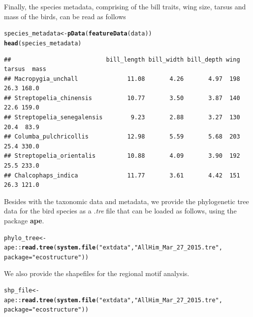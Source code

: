 \documentclass[12pt]{article}\usepackage[]{graphicx}\usepackage[usenames,dvipsnames]{color}
\makeatletter
\newcommand{\hlstr}[1]{\textcolor[rgb]{0.192,0.494,0.8}{#1}}%
\newcommand{\hlopt}[1]{\textcolor[rgb]{0,0,0}{#1}}%
\newcommand{\hlstd}[1]{\textcolor[rgb]{0.345,0.345,0.345}{#1}}%
\newcommand{\hlkwb}[1]{\textcolor[rgb]{0.69,0.353,0.396}{#1}}%
\newcommand{\hlkwc}[1]{\textcolor[rgb]{0.333,0.667,0.333}{#1}}%
\newcommand{\hlkwd}[1]{\textcolor[rgb]{0.737,0.353,0.396}{\textbf{#1}}}%
\newenvironment{kframe}{%
 \def\at@end@of@kframe{}%
 \ifinner\ifhmode%
  \def\at@end@of@kframe{\end{minipage}}%
  \begin{minipage}{\columnwidth}%
 \fi\fi%
 \def\FrameCommand##1{\hskip\@totalleftmargin \hskip-\fboxsep
 \colorbox{shadecolor}{##1}\hskip-\fboxsep
     \hskip-\linewidth \hskip-\@totalleftmargin \hskip\columnwidth}%
 \MakeFramed {\advance\hsize-\width
   \@totalleftmargin\z@ \linewidth\hsize
   \@setminipage}}%
 {\par\unskip\endMakeFramed%
 \at@end@of@kframe}
\newenvironment{knitrout}{}{} %
\makeatother
\begin{document}
Finally, the species metadata, comprising of the bill traits, wing size, tarsus and mass of the birds, can be read as follows

\begin{knitrout}
\color{fgcolor}\begin{kframe}
\begin{alltt}
\hlstd{species_metadata} \hlkwb{<-} \hlkwd{pData}\hlstd{(}\hlkwd{featureData}\hlstd{(data))}
\hlkwd{head}\hlstd{(species_metadata)}
\end{alltt}
\begin{verbatim}
##                           bill_length bill_width bill_depth wing tarsus  mass
## Macropygia_unchall              11.08       4.26       4.97  198   26.3 168.0
## Streptopelia_chinensis          10.77       3.50       3.87  140   22.6 159.0
## Streptopelia_senegalensis        9.23       2.88       3.27  130   20.4  83.9
## Columba_pulchricollis           12.98       5.59       5.68  203   25.4 330.0
## Streptopelia_orientalis         10.88       4.09       3.90  192   25.5 233.0
## Chalcophaps_indica              11.77       3.61       4.42  151   26.3 121.0
\end{verbatim}
\end{kframe}
\end{knitrout}


Besides with the taxonomic data and metadata, we provide the phylogenetic tree data for the bird species as a \textit{.tre} file that can be loaded as follows, using the package \textbf{ape}.

\begin{knitrout}
\color{fgcolor}\begin{kframe}
\begin{alltt}
\hlstd{phylo_tree} \hlkwb{<-} \hlstd{ape}\hlopt{::}\hlkwd{read.tree}\hlstd{(}\hlkwd{system.file}\hlstd{(}\hlstr{"extdata"}\hlstd{,} \hlstr{"AllHim_Mar_27_2015.tre"}\hlstd{,}
                             \hlkwc{package} \hlstd{=} \hlstr{"ecostructure"}\hlstd{))}
\end{alltt}
\end{kframe}
\end{knitrout}


We also provide the shapefiles for the regional motif analysis.

\begin{knitrout}
\color{fgcolor}\begin{kframe}
\begin{alltt}
\hlstd{shp_file} \hlkwb{<-} \hlstd{ape}\hlopt{::}\hlkwd{read.tree}\hlstd{(}\hlkwd{system.file}\hlstd{(}\hlstr{"extdata"}\hlstd{,} \hlstr{"AllHim_Mar_27_2015.tre"}\hlstd{,}
                             \hlkwc{package} \hlstd{=} \hlstr{"ecostructure"}\hlstd{))}
\end{alltt}
\end{kframe}
\end{knitrout}
\end{document}
